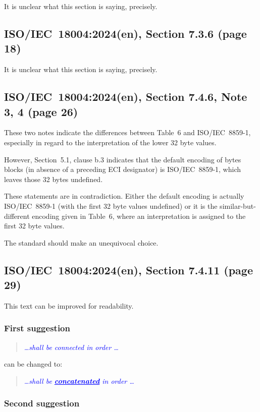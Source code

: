 \documentclass[a4paper,twoside]{article}
\newcommand{\shortstandard}{ISO/IEC~18004}
\newcommand{\standard}{\shortstandard:2024(en)}
\newcommand{\quotestandard}[1]{\textcolor{blue}{\textit{#1}}}
\newcommand{\ddd}{\dots}
\newcommand{\change}[1]{\underline{\textbf{#1}}}
\begin{document}
It is unclear what this section is saying, precisely.

\subsection{\standard, Section 7.3.6 (page 18)}

It is unclear what this section is saying, precisely.

\subsection{\standard, Section 7.4.6, Note 3, 4 (page 26)}

These two notes indicate the differences between Table~6 and ISO/IEC~8859-1, especially in
regard to the interpretation of  the lower 32 byte values.

However, Section~5.1, clause b.3 indicates that the default encoding of bytes blocks
(in absence of a preceding ECI designator) is ISO/IEC~8859-1, which leaves those 32 bytes
undefined.

These statements are in contradiction. Either the default encoding is actually ISO/IEC~8859-1
(with the first 32 byte values undefined) or it is the similar-but-different encoding given
in Table~6, where an interpretation is assigned to the first 32 byte values.

The standard should make an unequivocal choice.

\subsection{\standard, Section 7.4.11 (page 29)}

This text can be improved for readability.

\subsubsection*{First suggestion}

\begin{quote}
\quotestandard{\ddd shall be connected in order \ddd}
\end{quote}

can be changed to:

\begin{quote}
\quotestandard{\ddd shall be \change{concatenated} in order \ddd}
\end{quote}

\subsubsection*{Second suggestion}
\end{document}
